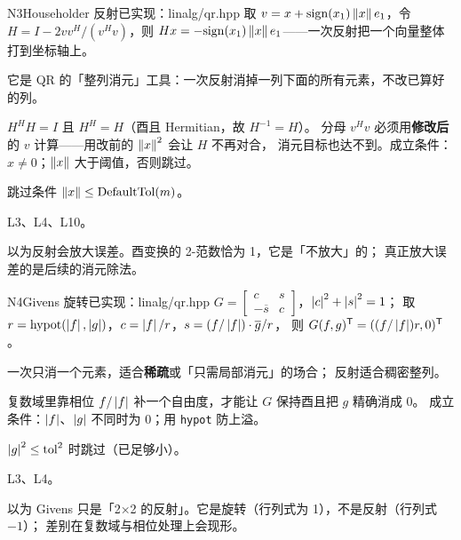 \begin{know}{N3}{Householder 反射}{已实现：linalg/qr.hpp}
 取 $v=x+\mathrm{sign}(x_1)\left\lVert x\right\rVert e_1$，令 $H=I-2vv^{H}/(v^{H}v)$，则
$Hx=-\mathrm{sign}(x_1)\left\lVert x\right\rVert e_1$——一次反射把一个向量整体打到坐标轴上。

 它是 QR 的「整列消元」工具：一次反射消掉一列下面的所有元素，不改已算好的列。

 $H^{H}H=I$ 且 $H^{H}=H$（酉且 Hermitian，故 $H^{-1}=H$）。
分母 $v^{H}v$ 必须用\textbf{修改后}的 $v$ 计算——用改前的 $\left\lVert x\right\rVert^{2}$ 会让 $H$ 不再对合，
消元目标也达不到。成立条件：$x\ne0$；$\left\lVert x\right\rVert$ 大于阈值，否则跳过。

 跳过条件 $\left\lVert x\right\rVert\le \mathrm{DefaultTol}(m)$。

 L3、L4、L10。

 以为反射会放大误差。酉变换的 2-范数恰为 1，它是「不放大」的；
真正放大误差的是后续的消元除法。
\end{know}

\begin{know}{N4}{Givens 旋转}{已实现：linalg/qr.hpp}
 $G=\begin{bmatrix}c&s\\-\overline{s}&c\end{bmatrix}$，$\left\lvert c\right\rvert^{2}+\left\lvert s\right\rvert^{2}=1$；
取 $r=\mathrm{hypot}(\left\lvert f\right\rvert,\left\lvert g\right\rvert)$，$c=\left\lvert f\right\rvert/r$，$s=(f/\left\lvert f\right\rvert)\cdot\overline{g}/r$，
则 $G(f,g)^{\mathsf T}=((f/\left\lvert f\right\rvert)r,0)^{\mathsf T}$。

 一次只消一个元素，适合\textbf{稀疏}或「只需局部消元」的场合；
反射适合稠密整列。

 复数域里靠相位 $f/\left\lvert f\right\rvert$ 补一个自由度，才能让 $G$ 保持酉且把 $g$ 精确消成 0。
成立条件：$\left\lvert f\right\rvert$、$\left\lvert g\right\rvert$ 不同时为 0；用 \texttt{hypot} 防上溢。

 $\left\lvert g\right\rvert^{2}\le\mathrm{tol}^{2}$ 时跳过（已足够小）。

 L3、L4。

 以为 Givens 只是「2×2 的反射」。它是旋转（行列式为 1），不是反射（行列式 $-1$）；
差别在复数域与相位处理上会现形。
\end{know}

